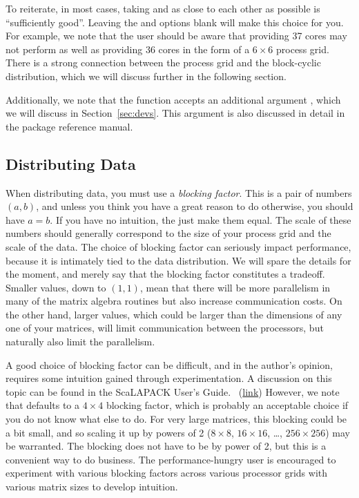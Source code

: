 To reiterate, in most cases, taking  and  as close to each other as possible is ``sufficiently good''.  Leaving the  and  options blank will make this choice for you.  For example, we note that the user should be aware that providing 37 cores may not perform as well as providing 36 cores in the form of a $6\times6$ process grid.  There is a strong connection between the process grid and the block-cyclic distribution, which we will discuss further in the following section.

Additionally, we note that the  function accepts an additional argument , which we will discuss in Section~\ref{sec:devs}.  This argument is also discussed in detail in the package reference manual.

\subsection{Distributing Data}

When distributing data, you must use a \emph{blocking factor}.  This is a pair of numbers $(a,b)$, and unless you think you have a great reason to do otherwise, you should have $a=b$.  If you have no intuition, the just make them equal.  The scale of these numbers should generally correspond to the size of your process grid and the scale of the data.  The choice of blocking factor can seriously impact performance, because it is intimately tied to the data distribution.  We will spare the details for the moment, and merely say that the blocking factor constitutes a tradeoff.  Smaller values, down to $(1,1)$, mean that there will be more parallelism in many of the matrix algebra routines but also increase communication costs.  On the other hand, larger values, which could be larger than the dimensions of any one of your matrices, will limit communication between the processors, but naturally also limit the parallelism.

A good choice of blocking factor can be difficult, and in the author's opinion, requires some intuition gained through experimentation.  A discussion on this topic can be found in the ScaLAPACK User's Guide.~\citep{slug} (\href{http://www.netlib.org/utk/papers/scalapack/node19.html}{link}) However, we note that  defaults to a $4\times 4$ blocking factor, which is probably an acceptable choice if you do not know what else to do.  For very large matrices, this blocking could be a bit small, and so scaling it up by powers of 2 ($8\times 8$, $16\times 16$, \dots, $256\times 256$) may be warranted.  The blocking does not have to be by power of 2, but this is a convenient way to do business.  The performance-hungry user is encouraged to experiment with various blocking factors across various processor grids with various matrix sizes to develop intuition.



